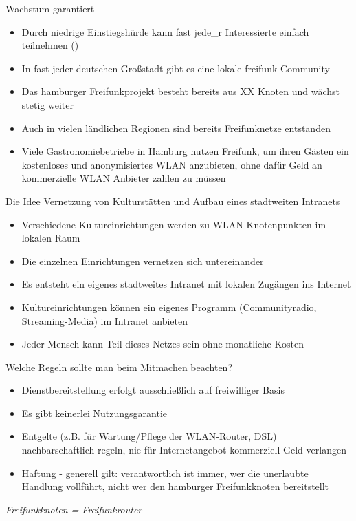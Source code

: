 \documentclass[aspectratio=43]{beamer}
\begin{document}
\begin{frame}{Wachstum garantiert}
	\begin{itemize}
		\item Durch niedrige Einstiegshürde kann fast jede\_r Interessierte einfach teilnehmen ()
		\item In fast jeder deutschen Großstadt gibt es eine lokale freifunk-Community
		\item Das hamburger Freifunkprojekt besteht bereits aus XX Knoten und wächst stetig weiter %
		\item Auch in vielen ländlichen Regionen sind bereits Freifunknetze entstanden
		\item Viele Gastronomiebetriebe in Hamburg nutzen Freifunk, um ihren Gästen ein kostenloses und anonymisiertes WLAN anzubieten, ohne dafür Geld an kommerzielle WLAN Anbieter zahlen zu müssen %
	\end{itemize}
\end{frame}

\begin{frame}{Die Idee}
	Vernetzung von Kulturstätten und Aufbau eines stadtweiten Intranets
	\begin{itemize}
		\item Verschiedene Kultureinrichtungen werden zu WLAN-Knotenpunkten im lokalen Raum
		\item Die einzelnen Einrichtungen vernetzen sich untereinander
		\item Es entsteht ein eigenes stadtweites Intranet mit lokalen Zugängen ins Internet
		\item Kultureinrichtungen können ein eigenes Programm (Communityradio, Streaming-Media) im Intranet anbieten
		\item Jeder Mensch kann Teil dieses Netzes sein ohne monatliche Kosten
	\end{itemize}
\end{frame}

\begin{frame}{Welche Regeln sollte man beim Mitmachen beachten?}
	\begin{itemize}
		\item Dienstbereitstellung erfolgt ausschließlich auf freiwilliger Basis
		\item Es gibt keinerlei Nutzungsgarantie
		\item Entgelte (z.B. für Wartung/Pflege der WLAN-Router, DSL) nachbarschaftlich regeln, nie für Internetangebot kommerziell Geld verlangen
		\item Haftung - generell gilt: verantwortlich ist immer, wer die unerlaubte Handlung vollführt, nicht wer den hamburger Freifunkknoten bereitstellt
	\end{itemize}
	\it{Freifunkknoten = Freifunkrouter} %
\end{frame}
\end{document}

